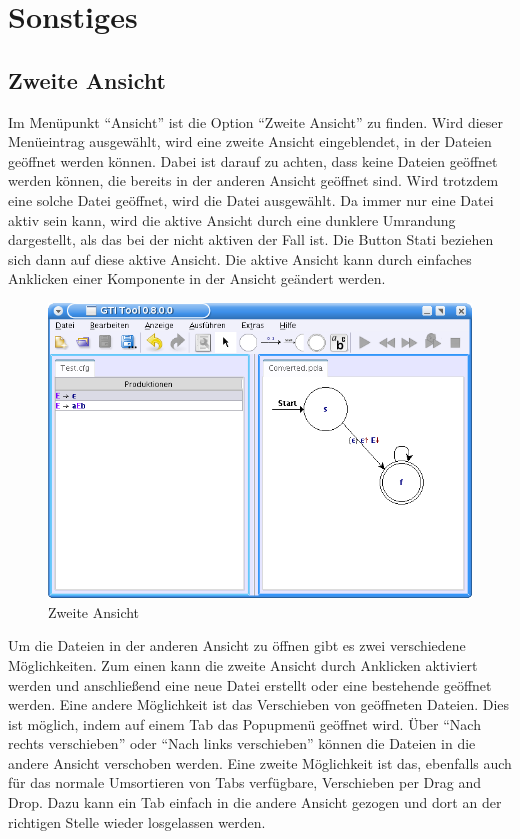 \chapter{Sonstiges}


\section{Zweite Ansicht}

Im Menüpunkt "`Ansicht"' ist die Option "`Zweite Ansicht"' zu finden. Wird dieser
Menüeintrag ausgewählt, wird eine zweite Ansicht eingeblendet, in der Dateien
geöffnet werden können. Dabei ist darauf zu achten, dass keine Dateien geöffnet
werden können, die bereits in der anderen Ansicht geöffnet sind. Wird trotzdem
eine solche Datei geöffnet, wird die Datei ausgewählt. Da immer nur eine Datei
aktiv sein kann, wird die aktive Ansicht durch eine dunklere Umrandung
dargestellt, als das bei der nicht aktiven der Fall ist. Die Button Stati
beziehen sich dann auf diese aktive Ansicht. Die aktive Ansicht kann durch
einfaches Anklicken einer Komponente in der Ansicht geändert werden.\vspace{10pt}

\begin{figure}[h]
\begin{center}
\includegraphics[width=12cm]{images/second_view.png}
\caption{Zweite Ansicht}
\end{center}
\end{figure}

Um die Dateien in der anderen Ansicht zu öffnen gibt es zwei verschiedene
Möglichkeiten. Zum einen kann die zweite Ansicht durch Anklicken aktiviert werden
und anschließend eine neue Datei erstellt oder eine bestehende geöffnet werden.
Eine andere Möglichkeit ist das Verschieben von geöffneten Dateien. Dies ist
möglich, indem auf einem Tab das Popupmenü geöffnet wird. Über "`Nach rechts
verschieben"' oder "`Nach links verschieben"' können die Dateien in die andere
Ansicht verschoben werden. Eine zweite Möglichkeit ist das, ebenfalls auch für
das normale Umsortieren von Tabs verfügbare, Verschieben per Drag and Drop.
Dazu kann ein Tab einfach in die andere Ansicht gezogen und dort an der richtigen
Stelle wieder losgelassen werden.\vspace{10pt}

